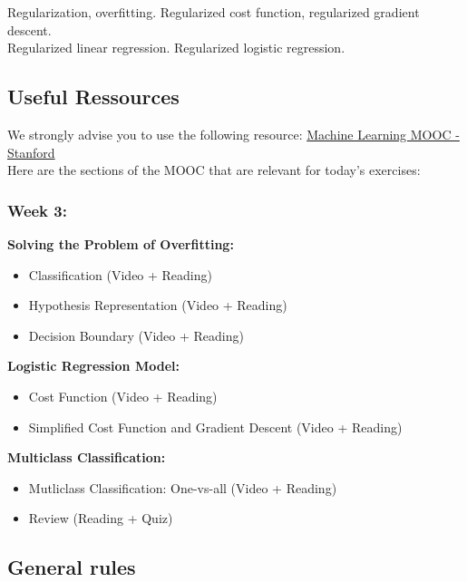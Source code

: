 \documentclass[]{article}
\begin{document}
Regularization, overfitting. Regularized cost function, regularized
gradient descent.\\
Regularized linear regression. Regularized logistic regression.

\hypertarget{useful-ressources}{%
\subsection{Useful Ressources}\label{useful-ressources}}

We strongly advise you to use the following resource:
\href{https://www.coursera.org/learn/machine-learning/home/week/3}{Machine
Learning MOOC - Stanford}\\
Here are the sections of the MOOC that are relevant for today's
exercises:

\hypertarget{week-3}{%
\subsubsection{Week 3:}\label{week-3}}

\textbf{Solving the Problem of Overfitting:}

\begin{itemize}
\item
  Classification (Video + Reading)
\item
  Hypothesis Representation (Video + Reading)
\item
  Decision Boundary (Video + Reading)
\end{itemize}

\textbf{Logistic Regression Model:}

\begin{itemize}
\item
  Cost Function (Video + Reading)
\item
  Simplified Cost Function and Gradient Descent (Video + Reading)
\end{itemize}

\textbf{Multiclass Classification:}

\begin{itemize}
\item
  Mutliclass Classification: One-vs-all (Video + Reading)
\item
  Review (Reading + Quiz)
\end{itemize}

\hypertarget{general-rules}{%
\subsection{General rules}\label{general-rules}}
\end{document}
